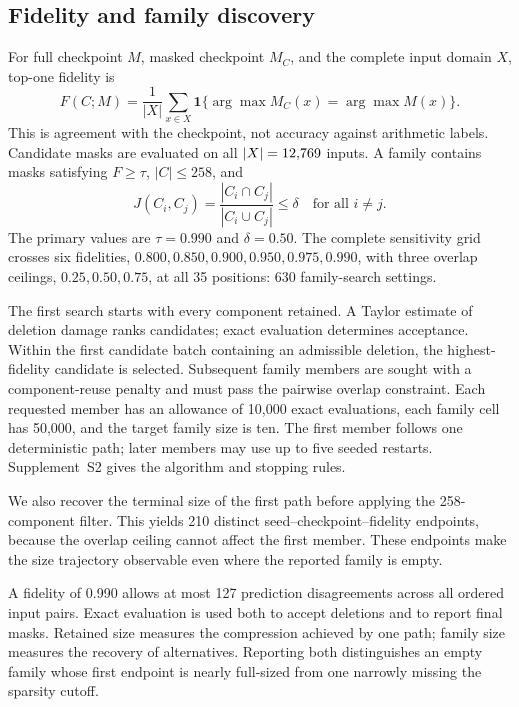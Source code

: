 \subsection{Fidelity and family discovery}

For full checkpoint $M$, masked checkpoint $M_C$, and the complete input domain $X$, top-one fidelity is
\begin{equation}
 F(C;M)=\frac{1}{|X|}\sum_{x\in X}
 \mathbf{1}\{\arg\max M_C(x)=\arg\max M(x)\}.
 \label{eq:fidelity}
\end{equation}
This is agreement with the checkpoint, not accuracy against arithmetic labels. Candidate masks are evaluated on all $|X|=12{,}769$ inputs. A family contains masks satisfying $F\geq\tau$, $|C|\leq258$, and
\begin{equation}
 J(C_i,C_j)=\frac{|C_i\cap C_j|}{|C_i\cup C_j|}\leq\delta
 \quad\text{for all }i\ne j.
\end{equation}
The primary values are $\tau=0.990$ and $\delta=0.50$. The complete sensitivity grid crosses six fidelities, $0.800,0.850,0.900,0.950,0.975,0.990$, with three overlap ceilings, $0.25,0.50,0.75$, at all 35 positions: 630 family-search settings.

The first search starts with every component retained. A Taylor estimate of deletion damage ranks candidates; exact evaluation determines acceptance. Within the first candidate batch containing an admissible deletion, the highest-fidelity candidate is selected. Subsequent family members are sought with a component-reuse penalty and must pass the pairwise overlap constraint. Each requested member has an allowance of 10,000 exact evaluations, each family cell has 50,000, and the target family size is ten. The first member follows one deterministic path; later members may use up to five seeded restarts. Supplement~S2 gives the algorithm and stopping rules.

We also recover the terminal size of the first path before applying the 258-component filter. This yields 210 distinct seed--checkpoint--fidelity endpoints, because the overlap ceiling cannot affect the first member. These endpoints make the size trajectory observable even where the reported family is empty.

A fidelity of 0.990 allows at most 127 prediction disagreements across all ordered input pairs. Exact evaluation is used both to accept deletions and to report final masks. Retained size measures the compression achieved by one path; family size measures the recovery of alternatives. Reporting both distinguishes an empty family whose first endpoint is nearly full-sized from one narrowly missing the sparsity cutoff.

